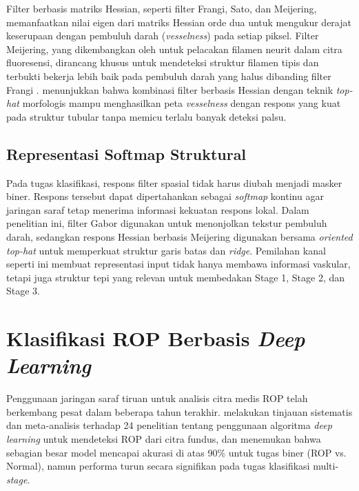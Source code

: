 Filter berbasis matriks Hessian, seperti filter Frangi, Sato, dan Meijering, memanfaatkan
nilai eigen dari matriks Hessian orde dua untuk mengukur derajat keserupaan dengan pembuluh darah (\textit{vesselness}) pada
setiap piksel. Filter Meijering, yang dikembangkan oleh \citet{Meijering2004} untuk pelacakan
filamen neurit dalam citra fluoresensi, dirancang khusus untuk mendeteksi struktur filamen tipis
dan terbukti bekerja lebih baik pada pembuluh darah yang halus dibanding filter Frangi
\citep{Tian2021}. \citet{Almeida2024} menunjukkan bahwa kombinasi filter berbasis Hessian
dengan teknik \textit{top-hat} morfologis mampu menghasilkan peta \textit{vesselness} dengan
respons yang kuat pada struktur tubular tanpa memicu terlalu banyak deteksi palsu.

\subsection{Representasi Softmap Struktural}

Pada tugas klasifikasi, respons filter spasial tidak harus diubah menjadi masker biner.
Respons tersebut dapat dipertahankan sebagai \textit{softmap} kontinu agar jaringan saraf tetap
menerima informasi kekuatan respons lokal. Dalam penelitian ini, filter Gabor digunakan untuk
menonjolkan tekstur pembuluh darah, sedangkan respons Hessian berbasis Meijering digunakan
bersama \textit{oriented top-hat} untuk memperkuat struktur garis batas dan \textit{ridge}.
Pemilahan kanal seperti ini membuat representasi input tidak hanya membawa informasi vaskular,
tetapi juga struktur tepi yang relevan untuk membedakan Stage 1, Stage 2, dan Stage 3.

\section{Klasifikasi ROP Berbasis \textit{Deep Learning}}

Penggunaan jaringan saraf tiruan untuk analisis citra medis ROP telah berkembang pesat dalam
beberapa tahun terakhir. \citet{Zhang2021} melakukan tinjauan sistematis dan meta-analisis
terhadap 24 penelitian tentang penggunaan algoritma \textit{deep learning} untuk mendeteksi
ROP dari citra fundus, dan menemukan bahwa sebagian besar model mencapai akurasi di atas 90\%
untuk tugas biner (ROP vs. Normal), namun performa turun secara signifikan pada tugas
klasifikasi multi-\textit{stage}.

